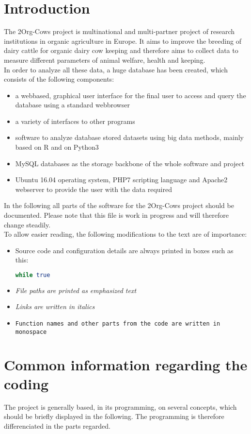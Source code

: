 
\section{Introduction}

The 2Org-Cows project is multinational and multi-partner project of research institutions in organic agriculture in Europe. It aims to improve the breeding of dairy cattle for 
organic dairy cow keeping and therefore aims to collect data to measure different parameters of animal welfare, health and keeping.\\
In order to analyze all these data, a huge database has been created, which consists of the following components:
\begin{itemize}
 \item a webbased, graphical user interface for the final user to access and query the database using a standard webbrowser
 \item a variety of interfaces to other programs
 \item software to analyze database stored datasets using big data methods, mainly based on R and on Python3
 \item MySQL databases as the storage backbone of the whole software and project
 \item Ubuntu 16.04 operating system, PHP7 scripting language and Apache2 webserver to provide the user with the data required
\end{itemize}
In the following all parts of the software for the 2Org-Cows project should be documented. Please note that this file is work in progress and will therefore change steadily.\\
To allow easier reading, the following modifications to the text are of importance:
\begin{itemize}
\item Source code and configuration details are always printed in boxes such as this: 
  \begin{lstlisting}[language=bash] 
  while true 
  \end{lstlisting}
\item \emph{File paths are printed as emphasized text}
\item \textit{Links are written in italics}
\item \texttt{Function names and other parts from the code are written in monospace}
\end{itemize}

\section{Common information regarding the coding}
The project is generally based, in its programming, on several concepts, which should be briefly displayed in the following. The programming is therefore differenciated in the 
parts regarded. 
